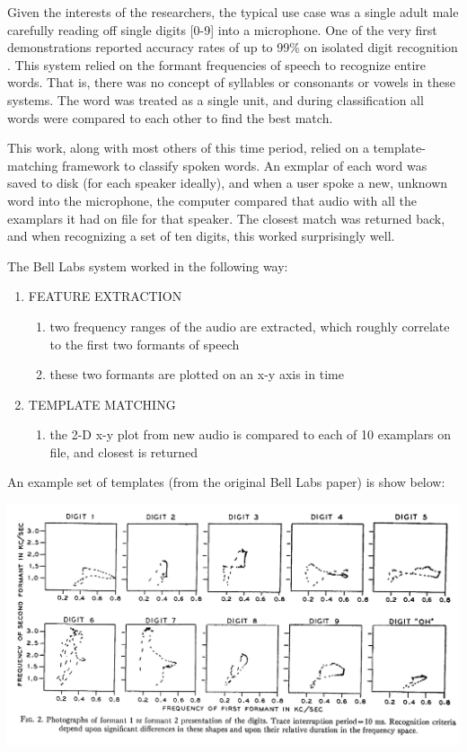 \documentclass[10pt,a4paper]{article}
\begin{document}
Given the interests of the researchers, the typical use case was a single adult male carefully reading off single digits [0-9] into a microphone. One of the very first demonstrations reported accuracy rates of up to 99\% on isolated digit recognition \cite{davis1952automatic}. This system relied on the formant frequencies of speech to recognize entire words. That is, there was no concept of syllables or consonants or vowels in these systems. The word was treated as a single unit, and during classification all words were compared to each other to find the best match.

This work, along with most others of this time period, relied on a template-matching framework to classify spoken words. An exmplar of each word was saved to disk (for each speaker ideally), and when a user spoke a new, unknown word into the microphone, the computer compared that audio with all the examplars it had on file for that speaker. The closest match was returned back, and when recognizing a set of ten digits, this worked surprisingly well. 

The Bell Labs system worked in the following way:

\begin{enumerate}
\item FEATURE EXTRACTION
  \begin{enumerate}
  \item two frequency ranges of the audio are extracted, which roughly correlate to the first two formants of speech
  \item these two formants are plotted on an x-y axis in time
  \end{enumerate}
  
\item TEMPLATE MATCHING
  \begin{enumerate}
  \item the 2-D x-y plot from new audio is compared to each of 10 examplars on file, and closest is returned
  \end{enumerate}
\end{enumerate}


An example set of templates (from the original Bell Labs paper) is show below:


\begin{center}
\includegraphics[width=.7\textwidth,keepaspectratio]{figs/digits.png}
\end{center}
\end{document}
